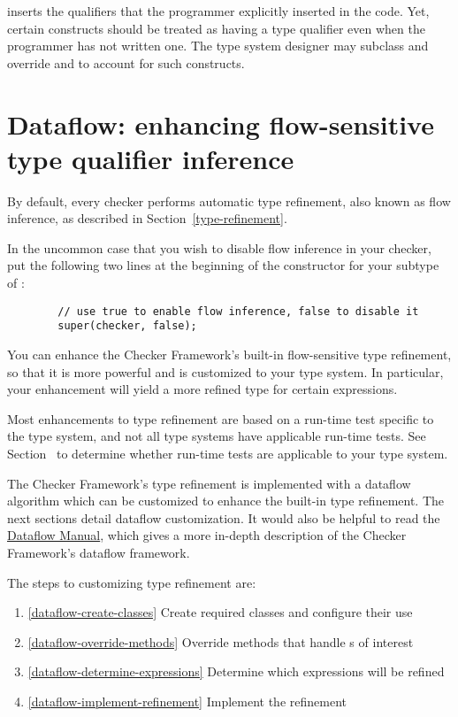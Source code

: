  inserts the qualifiers that the programmer
explicitly inserted in the code.  Yet, certain constructs should be
treated as having a type qualifier even when the programmer has not
written one.  The type system designer may subclass
 and override
 and
 to account for
such constructs.


\section{Dataflow: enhancing flow-sensitive type qualifier inference\label{dataflow}}

By default, every checker performs automatic type refinement, also known as
flow inference, as described
in Section~\ref{type-refinement}.

In the uncommon case that you wish to disable flow inference in your
checker, put the following two lines at the beginning of the constructor
for your subtype of
:

\begin{Verbatim}
        // use true to enable flow inference, false to disable it
        super(checker, false);
\end{Verbatim}

You can enhance the Checker Framework's built-in flow-sensitive type refinement,
so that it is more powerful and is customized to your type system. In
particular, your enhancement will yield a more refined type for certain
expressions.

Most enhancements to type refinement are based on a
run-time test specific to the type system, and not all type systems have
applicable run-time tests.  See
Section~ to determine whether
run-time tests are applicable to your type system.

The Checker Framework's type refinement is implemented with a dataflow algorithm
which can be customized to enhance the built-in type refinement. The next
sections detail dataflow customization.  It would also be helpful to read the
\href{http://types.cs.washington.edu/checker-framework/current/checker-framework-dataflow-manual.pdf}
{Dataflow Manual}, which gives a more in-depth description of the Checker
Framework's dataflow framework.

The steps to customizing type refinement are:
\begin{enumerate}
\item{\ref{dataflow-create-classes}} Create required classes and configure their
    use
\item{\ref{dataflow-override-methods}} Override methods that handle
    s of interest
\item{\ref{dataflow-determine-expressions}} Determine which expressions will be
    refined
\item{\ref{dataflow-implement-refinement}} Implement the refinement
\end{enumerate}

